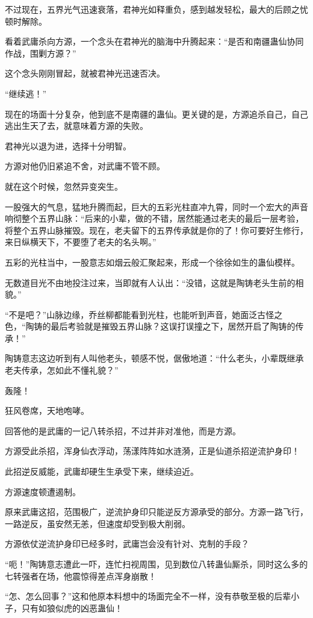 \begin{this_body}
不过现在，五界光气迅速衰落，君神光如释重负，感到越发轻松，最大的后顾之忧顿时解除。

看着武庸杀向方源，一个念头在君神光的脑海中升腾起来：“是否和南疆蛊仙协同作战，围剿方源？”

这个念头刚刚冒起，就被君神光迅速否决。

“继续逃！”

现在的场面十分复杂，他到底不是南疆的蛊仙。更关键的是，方源追杀自己，自己逃出生天了去，就意味着方源的失败。

君神光以退为进，选择十分明智。

方源对他仍旧紧追不舍，对武庸不管不顾。

就在这个时候，忽然异变突生。

一股强大的气息，猛地升腾而起，巨大的五彩光柱直冲九霄，同时一个宏大的声音响彻整个五界山脉：“后来的小辈，做的不错，居然能通过老夫的最后一层考验，将整个五界山脉摧毁。现在，老夫留下的五界传承就是你的了！你可要好生修行，来日纵横天下，不要堕了老夫的名头啊。”

五彩的光柱当中，一股意志如烟云般汇聚起来，形成一个徐徐如生的蛊仙模样。

无数道目光不由地投注过来，当即就有人认出：“没错，这就是陶铸老头生前的相貌。”

“不是吧？”山脉边缘，乔丝柳都能看到光柱，也能听到声音，她面泛古怪之色，“陶铸的最后考验就是摧毁五界山脉？这误打误撞之下，居然开启了陶铸的传承！”

陶铸意志这边听到有人叫他老头，顿感不悦，倨傲地道：“什么老头，小辈既继承老夫传承，怎如此不懂礼貌？”

轰隆！

狂风卷席，天地咆哮。

回答他的是武庸的一记八转杀招，不过并非对准他，而是方源。

方源受此杀招，浑身仙衣浮动，荡漾阵阵如水涟漪，正是仙道杀招逆流护身印！

此招逆反威能，武庸却硬生生承受下来，继续迫近。

方源速度顿遭遏制。

原来武庸这招，范围极广，逆流护身印只能逆反方源承受的部分。方源一路飞行，一路逆反，虽安然无恙，但速度却受到极大削弱。

方源依仗逆流护身印已经多时，武庸岂会没有针对、克制的手段？

“呃！”陶铸意志遭此一吓，连忙扫视周围，见到数位八转蛊仙厮杀，同时这么多的七转强者在场，他震惊得差点浑身崩散！

“怎、怎么回事？”这和他原本料想中的场面完全不一样，没有恭敬至极的后辈小子，只有如狼似虎的凶恶蛊仙！


\end{this_body}
